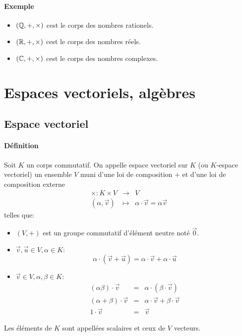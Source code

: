 \paragraph{Exemple}
\begin{itemize}
  \item $(\mathbb{Q}, +, \times)$ cest le corps des nombres rationels.
  \item $(\mathbb{R}, +, \times)$ cest le corps des nombres réels.
  \item $(\mathbb{C}, +, \times)$ cest le corps des nombres complexes.
\end{itemize}

%
%
\section{Espaces vectoriels, algèbres}
%
%

%
\subsection{Espace vectoriel}
%
\paragraph{Définition} Soit $K$ un corps commutatif. On appelle espace vectoriel sur $K$ (ou $K$-espace vectoriel) un ensemble $V$ muni d'une loi de composition $+$ et d'une loi de composition externe
\begin{eqnarray*}
  \times: K \times V &\rightarrow& V \\
  (\alpha, \vec{v}) &\mapsto& \alpha\cdot\vec{v} = \alpha\vec{v}
\end{eqnarray*}
telles que:
\begin{itemize}
  \item $(V, +)$ est un groupe commutatif d'élément neutre noté $\vec{0}$.
  \item \forall $\vec{v}, \vec{u} \in V, \alpha \in K$: $$\alpha \cdot (\vec{v}+\vec{u}) = \alpha \cdot \vec{v} + \alpha \cdot \vec{u}$$
  \item \forall $\vec{v} \in V, \alpha, \beta \in K$:
    \begin{eqnarray*}
      (\alpha \beta) \cdot \vec{v} &=& \alpha \cdot (\beta \cdot \vec{v}) \\
      (\alpha + \beta) \cdot \vec{v} &=& \alpha \cdot \vec{v} + \beta \cdot \vec{v} \\
      1 \cdot \vec{v} &=& \vec{v}
    \end{eqnarray*}
\end{itemize}
Les éléments de $K$ sont appellées scalaires et ceux de $V$ vecteurs.

